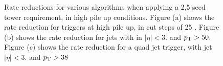 \begin{figure}[h!]
    \centering
     \newline
    \caption{Rate reductions for various \Lone algorithms when applying a 2,5 
    \GeV seed tower requirement, in high pile up
    conditions. Figure (a) shows the rate reduction for \HT triggers at high 
    pile up, in cut steps of 25 \GeV. Figure (b) shows
    the rate reduction for jets with in $|\eta| <3.$ and $p_{\mathrm{T}} > 50$\GeV. Figure 
    (c) shows the rate reduction for a quad jet
    trigger, with jet $|\eta| <3.$ and $p_{\mathrm{T}} > 38$\GeV}
    
    \label{fig:highpuratereduction}
\end{figure}

